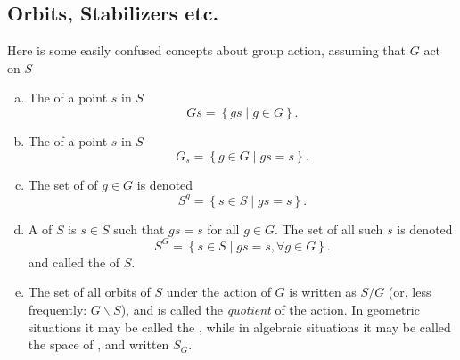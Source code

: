 \subsection{Orbits, Stabilizers etc.}
\begin{defn}
Here is some easily confused concepts about group action, assuming that $G$ act on $S$
  \begin{enumerate}[a)]
    \setlength{\itemindent}{2ex}
    \item The  of a point $s$ in $S$
    \begin{equation*}
       Gs= \left\{ gs \mid g \in G \right\}.
    \end{equation*}
    \item The  of a point $s$ in $S$
    \begin{equation*}
       G_s= \left\{ g \in G \mid gs=s \right\}.
    \end{equation*}
    \item The set of  of $g\in G$ is denoted
    \begin{equation*}
       S^g= \left\{ s \in S \mid gs=s \right\}.
    \end{equation*}
    \item A  of $S$ is $s\in S$ such that $gs=s$ for all $g\in G$. The set of all such $s$ is denoted
    \begin{equation*}
       S^G= \left\{ s \in S \mid gs=s, \forall g\in G \right\}.
    \end{equation*}
     and called the  of $S$.
     \item The set of all orbits of $S$ under the action of $G$ is written as $S/G$ (or, less frequently: $G\backslash S$), and is called the \emph{\red  quotient} of the action.
     In geometric situations it may be called the , while in algebraic situations it may be called the space of , and written $S_G$.
  \end{enumerate}
\end{defn}

